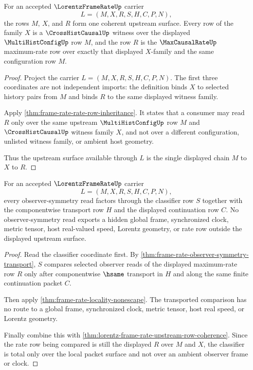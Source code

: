 \begin{theorem}
\label{thm:lorentz-frame-rate-upstream-row-coherence}
For an accepted $\LorentzFrameRateUp$ carrier
$$
L=(M,X,R,S,H,C,P,N),
$$
the rows $M$, $X$, and $R$ form one coherent upstream surface. Every row of the family $X$ is a $\CrossHistCausalUp$ witness over the displayed $\MultiHistConfigUp$ row $M$, and the row $R$ is the $\MaxCausalRateUp$ maximum-rate row over exactly that displayed $X$-family and the same configuration row $M$.
\end{theorem}
\begin{proof}
Project the carrier $L=(M,X,R,S,H,C,P,N)$. The first three coordinates are not independent imports: the definition binds $X$ to selected history pairs from $M$ and binds $R$ to the same displayed witness family.

Apply \autoref{thm:frame-rate-rate-row-inheritance}. It states that a consumer may read $R$ only over the same upstream $\MultiHistConfigUp$ row $M$ and $\CrossHistCausalUp$ witness family $X$, and not over a different configuration, unlisted witness family, or ambient host geometry.

Thus the upstream surface available through $L$ is the single displayed chain $M$ to $X$ to $R$.
\end{proof}

\begin{theorem}
\label{thm:lorentz-frame-rate-symmetry-classifier-totality}
For an accepted $\LorentzFrameRateUp$ carrier
$$
L=(M,X,R,S,H,C,P,N),
$$
every observer-symmetry read factors through the classifier row $S$ together with the componentwise transport row $H$ and the displayed continuation row $C$. No observer-symmetry read exports a hidden global frame, synchronized clock, metric tensor, host real-valued speed, Lorentz geometry, or rate row outside the displayed upstream surface.
\end{theorem}
\begin{proof}
Read the classifier coordinate first. By \autoref{thm:frame-rate-observer-symmetry-transport}, $S$ compares selected observer reads of the displayed maximum-rate row $R$ only after componentwise $\hsame$ transport in $H$ and along the same finite continuation packet $C$.

Then apply \autoref{thm:frame-rate-locality-nonescape}. The transported comparison has no route to a global frame, synchronized clock, metric tensor, host real speed, or Lorentz geometry.

Finally combine this with \autoref{thm:lorentz-frame-rate-upstream-row-coherence}. Since the rate row being compared is still the displayed $R$ over $M$ and $X$, the classifier is total only over the local packet surface and not over an ambient observer frame or clock.
\end{proof}


